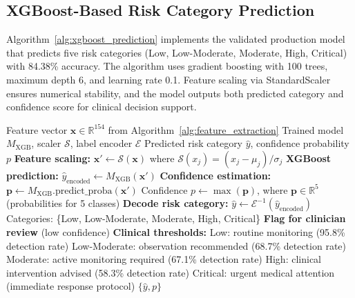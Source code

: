 \documentclass[3p,times,procedia]{elsarticle}
\begin{document}
\subsection{XGBoost-Based Risk Category Prediction}
\vspace{-2pt}

Algorithm~\ref{alg:xgboost_prediction} implements the validated production model that predicts five risk categories (Low, Low-Moderate, Moderate, High, Critical) with 84.38\% accuracy. The algorithm uses gradient boosting with 100 trees, maximum depth 6, and learning rate 0.1. Feature scaling via StandardScaler ensures numerical stability, and the model outputs both predicted category and confidence score for clinical decision support.

\begin{algorithm}[H]\footnotesize\setlength{\abovecaptionskip}{-2pt}
\caption{XGBoost Risk Category Prediction}
\label{alg:xgboost_prediction}
\begin{algorithmic}[1]
    \Require Feature vector $\mathbf{x} \in \mathbb{R}^{154}$ from Algorithm~\ref{alg:feature_extraction}
    \Require Trained model $M_{\text{XGB}}$, scaler $\mathcal{S}$, label encoder $\mathcal{E}$
    \Ensure Predicted risk category $\hat{y}$, confidence probability $p$
    \State \textbf{Feature scaling:} $\mathbf{x}' \gets \mathcal{S}(\mathbf{x})$ where $\mathcal{S}(x_j) = (x_j - \mu_j) / \sigma_j$
    \State \textbf{XGBoost prediction:} $\hat{y}_{\text{encoded}} \gets M_{\text{XGB}}(\mathbf{x}')$
    \State \textbf{Confidence estimation:} $\mathbf{p} \gets M_{\text{XGB}}.\text{predict\_proba}(\mathbf{x}')$
    \State \quad Confidence $p \gets \max(\mathbf{p})$, where $\mathbf{p} \in \mathbb{R}^5$ (probabilities for 5 classes)
    \State \textbf{Decode risk category:} $\hat{y} \gets \mathcal{E}^{-1}(\hat{y}_{\text{encoded}})$
    \State \quad Categories: \{Low, Low-Moderate, Moderate, High, Critical\}
        \State \textbf{Flag for clinician review} (low confidence)
    \EndIf
    \State \textbf{Clinical thresholds:}
    \State \quad Low: routine monitoring (95.8\% detection rate)
    \State \quad Low-Moderate: observation recommended (68.7\% detection rate)
    \State \quad Moderate: active monitoring required (67.1\% detection rate)
    \State \quad High: clinical intervention advised (58.3\% detection rate)
    \State \quad Critical: urgent medical attention (immediate response protocol)
    \State \Return $\{\hat{y}, p\}$
\end{algorithmic}
\end{algorithm}
\end{document}
